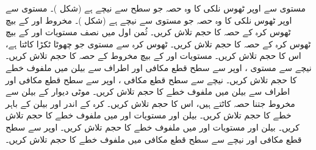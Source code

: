 مستوی  سے اوپر ٹھوس نلکی  کا وہ حصہ جو سطح  سے نیچے ہے (شکل )۔ 
مستوی  سے اوپر ٹھوس نلکی  کا وہ حصہ جو مستوی  سے نیچے ہے (شکل )۔ 
مخروط  اور  کے بیچ ٹھوس  کرہ  کے حصہ  کا حجم تلاش کریں۔
ثُمن اول میں نصف مستویات  اور  کے بیچ  ٹھوس کرہ    کے حصہ کا حجم تلاش کریں۔
ٹھوس کرہ  سے مستوی  جو چھوٹا ٹکڑا کاٹتا ہے، اس کا حجم تلاش کریں۔
مستویات  اور  کے بیچ مخروط  کے حصہ کا حجم تلاش کریں۔
نیچے سے مستوی ، اوپر سے سطح قطع مکافی  اور اطراف سے بیلن  میں ملفوف خطے کا حجم تلاش کریں۔
نیچے سے سطح قطع مکافی  ، اوپر سے سطح قطع مکافی  اور اطراف سے بیلن  میں ملفوف خطے کا حجم تلاش کریں۔
موٹی  دیوار کے بیلن   سے مخروط   جتنا حصہ کاٹتے ہیں، اس کا حجم تلاش کریں۔
کرہ  کے اندر اور بیلن  کے باہر خطے کا حجم تلاش کریں۔
بیلن  اور مستویات  اور  میں ملفوف خطے کا حجم تلاش کریں۔
\wf{\unexpanded{
\(16\pi\)
}}
بیلن  اور مستویات  اور  میں ملفوف خطے کا حجم تلاش کریں۔
اوپر سے سطح قطع مکافی  اور نیچے سے سطح قطع مکافی  میں ملفوف خطے کا حجم تلاش کریں۔
